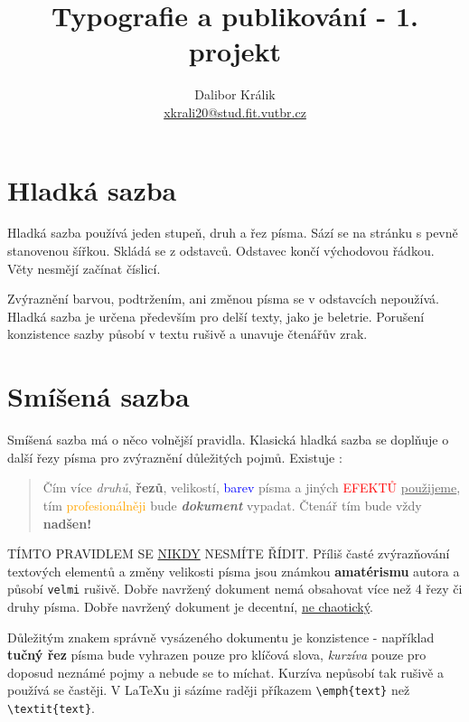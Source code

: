 \documentclass[10pt, a4paper, twocolumn]{article}
\title{Typografie a publikování - 1. projekt}
\author{Dalibor Králik \\ \href{mailto:xkrali20@stud.fit.vutbr.cz}{xkrali20@stud.fit.vutbr.cz}}
\date{}
\begin{document}
\maketitle

\section{Hladká sazba}

Hladká sazba používá jeden stupeň, druh a řez písma.
Sází se na stránku s pevně stanovenou šířkou.
Skládá se z odstavců. Odstavec končí východovou řádkou.
Věty nesmějí začínat číslicí.

Zvýraznění barvou, podtržením, ani změnou písma se v odstavcích nepoužívá.
Hladká sazba je určena především pro delší texty, jako je beletrie.
Porušení konzistence sazby působí v textu rušivě a unavuje čtenářův zrak.


\hypertarget{second}{\section{Smíšená sazba}}

Smíšená sazba má o něco volnější pravidla.
Klasická hladká sazba se doplňuje o další řezy písma pro zvýraznění důležitých pojmů.
Existuje :

\begin{quotation}
Čím více \emph{druhů}, \textbf{řezů}, {\huge velikostí}, \textcolor{blue}{barev} písma a jiných \textcolor{red}{\MakeUppercase{efektů}} \underline{použijeme}, tím \textcolor{orange}{profesionálněji} bude \textit{\large{\textbf{dokument}}} vypadat.
{\tiny Čtenář} tím bude vždy {\huge \textbf {nadšen!}}
\end{quotation}

\MakeUppercase{\small{Tímto pravidlem se \underline{nikdy} nesmíte řídit.}}
Příliš časté zvýrazňování textových elementů a změny {\tiny velikosti} písma jsou známkou \textbf{amatérismu} autora a působí \texttt{velmi} rušivě.
Dobře navržený dokument nemá obsahovat více než 4 řezy či druhy písma.
Dobře navržený dokument je decentní, \underline{ne chaotický}.

Důležitým znakem správně vysázeného dokumentu je konzistence - například \textbf{tučný řez} písma bude vyhrazen pouze pro klíčová slova, \emph{kurzíva} pouze pro doposud neznámé pojmy a nebude se to míchat.
Kurzíva nepůsobí tak rušivě a používá se častěji.
V \LaTeX u ji sázíme raději příkazem \texttt{\textbackslash emph\{text\}} než  \texttt{\textbackslash textit\{text\}}.
\end{document}

